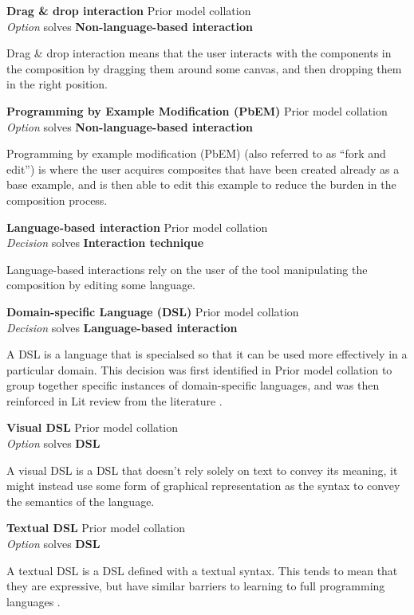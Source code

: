 \textbf{Drag \& drop interaction} \hfill Prior model collation \cite{Pietschmann2010} \\ \emph{Option} \hfill solves \textbf{Non-language-based interaction}

Drag \& drop interaction means that the user interacts with the components in the composition by dragging them around some canvas, and then dropping them in the right position.

\textbf{Programming by Example Modification (PbEM)} \hfill Prior model collation \cite{Aghaee2012} \\ \emph{Option} \hfill solves \textbf{Non-language-based interaction}

Programming by example modification (PbEM) (also referred to as ``fork and edit'') is where the user acquires composites that have been created already as a base example, and is then able to edit this example to reduce the burden in the composition process. 

\textbf{Language-based interaction} \hfill Prior model collation \cite{Minhas2012} \\ \emph{Decision} \hfill solves \textbf{Interaction technique}

Language-based interactions rely on the user of the tool manipulating the composition by editing some language.

\textbf{Domain-specific Language (DSL)} \hfill Prior model collation \\ \emph{Decision} \hfill solves \textbf{Language-based interaction}

A DSL is a language that is specialsed so that it can be used more effectively in a particular domain. This decision was first identified in Prior model collation to group together specific instances of domain-specific languages, and was then reinforced in Lit review from the literature \cite{Skrobo2011}.

\textbf{Visual DSL} \hfill Prior model collation \cite{Grammel2010,Aghaee2012} \\ \emph{Option} \hfill solves \textbf{DSL}

A visual DSL is a DSL that doesn't rely solely on text to convey its meaning, it might instead use some form of graphical representation as the syntax to convey the semantics of the language.

\textbf{Textual DSL} \hfill Prior model collation \cite{Aghaee2012} \\ \emph{Option} \hfill solves \textbf{DSL}

A textual DSL is a DSL defined with a textual syntax. This tends to mean that they are expressive, but have similar barriers to learning to full programming languages \cite{Aghaee2012}.

